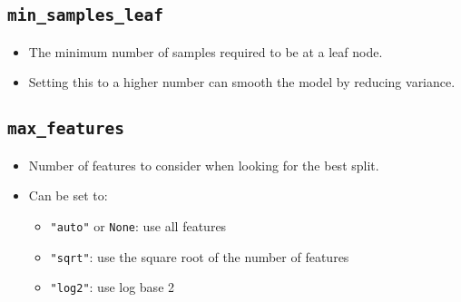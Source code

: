 \documentclass[
  letterpaper,
  DIV=11,
  numbers=noendperiod]{scrreprt}
\providecommand{\tightlist}{%
  \setlength{\itemsep}{0pt}\setlength{\parskip}{0pt}}\usepackage{longtable,booktabs,array}
\begin{document}
\subsection{\texorpdfstring{\texttt{min\_samples\_leaf}}{min\_samples\_leaf}}\label{min_samples_leaf}

\begin{itemize}
\tightlist
\item
  The minimum number of samples required to be at a leaf node.
\item
  Setting this to a higher number can smooth the model by reducing
  variance.
\end{itemize}

\subsection{\texorpdfstring{\texttt{max\_features}}{max\_features}}\label{max_features}

\begin{itemize}
\item
  Number of features to consider when looking for the best split.
\item
  Can be set to:

  \begin{itemize}
  \tightlist
  \item
    \texttt{"auto"} or \texttt{None}: use all features
  \item
    \texttt{"sqrt"}: use the square root of the number of features
  \item
    \texttt{"log2"}: use log base 2
  \end{itemize}
\end{itemize}
\end{document}
